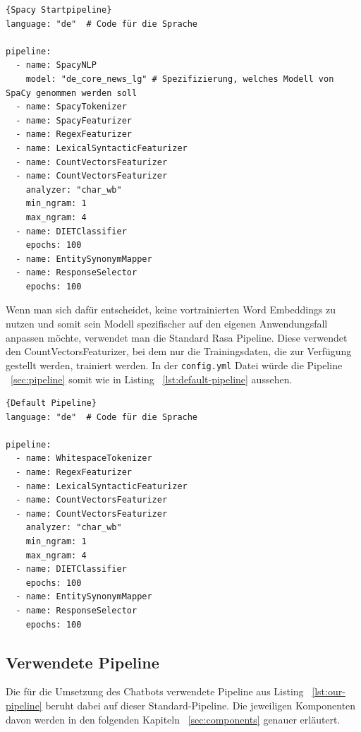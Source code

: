 \begin{lstlisting}[label={lst:spacy-pipeline},caption={Spacy Startpipeline}]{Spacy Startpipeline}
language: "de"  # Code für die Sprache

pipeline:
  - name: SpacyNLP
    model: "de_core_news_lg" # Spezifizierung, welches Modell von SpaCy genommen werden soll
  - name: SpacyTokenizer
  - name: SpacyFeaturizer
  - name: RegexFeaturizer
  - name: LexicalSyntacticFeaturizer
  - name: CountVectorsFeaturizer
  - name: CountVectorsFeaturizer
    analyzer: "char_wb"
    min_ngram: 1
    max_ngram: 4
  - name: DIETClassifier
    epochs: 100
  - name: EntitySynonymMapper
  - name: ResponseSelector
    epochs: 100

\end{lstlisting}

Wenn man sich dafür entscheidet, keine vortrainierten Word Embeddings zu nutzen und somit sein Modell spezifischer auf den eigenen Anwendungsfall anpassen möchte, verwendet man die Standard Rasa Pipeline.
Diese verwendet den CountVectorsFeaturizer, bei dem nur die Trainingsdaten, die zur Verfügung gestellt werden, trainiert werden.\cite{startingPipelines, allComponents, nluExamples}
In der \texttt{config.yml} Datei würde die Pipeline ~\ref{sec:pipeline} somit wie in Listing ~\ref{lst:default-pipeline} aussehen.

\begin{lstlisting}[label={lst:default-pipeline},caption={Default Pipeline}]{Default Pipeline}
language: "de"  # Code für die Sprache

pipeline:
  - name: WhitespaceTokenizer
  - name: RegexFeaturizer
  - name: LexicalSyntacticFeaturizer
  - name: CountVectorsFeaturizer
  - name: CountVectorsFeaturizer
    analyzer: "char_wb"
    min_ngram: 1
    max_ngram: 4
  - name: DIETClassifier
    epochs: 100
  - name: EntitySynonymMapper
  - name: ResponseSelector
    epochs: 100

\end{lstlisting}

\subsection{Verwendete Pipeline}\label{subsec:our-pipeline}

Die für die Umsetzung des Chatbots verwendete Pipeline aus Listing ~\ref{lst:our-pipeline} beruht dabei auf dieser Standard-Pipeline.
Die jeweiligen Komponenten davon werden in den folgenden Kapiteln ~\ref{sec:components} genauer erläutert.

